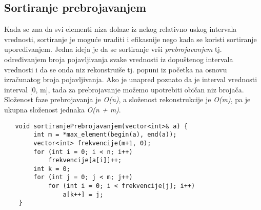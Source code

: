 \documentclass{article}
\begin{document}
\subsection{Sortiranje prebrojavanjem}
Kada se zna da svi elementi niza dolaze iz nekog relativno uskog intervala
vrednosti, sortiranje je moguće uraditi i efikasnije nego kada se koristi sortiranje
upoređivanjem.
Jedna ideja je da se sortiranje vrši \textit{prebrojavanjem} tj. određivanjem broja
pojavljivanja svake vrednosti iz dopuštenog intervala vrednosti i da se onda niz
rekonstruiše tj. popuni iz početka na osnovu izračunatog broja pojavljivanja. Ako
je unapred poznato da je interval vrednosti interval [0, m], tada za prebrojavanje
možemo upotrebiti običan niz brojača. Složenost faze prebrojavanja je \textit{O(n)}, a složenost rekonstrukcije je \textit{O(m)}, pa je
ukupna složenost jednaka \textit{O(n + m)}. 
\begin{lstlisting}
   void sortiranjePrebrojavanjem(vector<int>& a) {
        int m = *max_element(begin(a), end(a));
        vector<int> frekvencije(m+1, 0);
        for (int i = 0; i < n; i++)
            frekvencije[a[i]]++;
        int k = 0;
        for (int j = 0; j < m; j++)
            for (int i = 0; i < frekvencije[j]; i++)
                a[k++] = j;
    }
\end{lstlisting}
\end{document}
